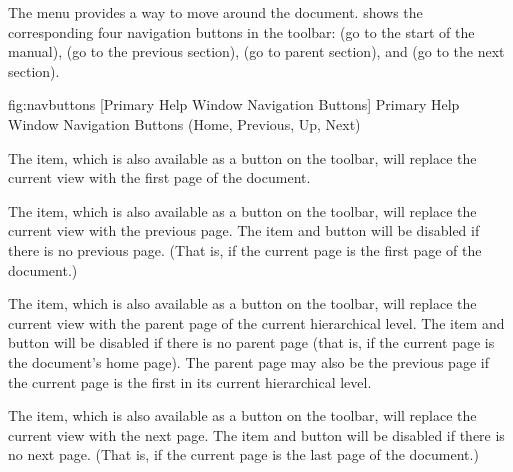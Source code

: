 
The  menu provides a way to move around
the document.
 shows the corresponding four navigation
buttons in the toolbar:  (go to the
start of the manual),  (go to the
previous section),  (go to parent
section), and  (go to the next
section).

\FloatFig
{fig:navbuttons}
{%
}
[Primary Help Window Navigation Buttons]
{Primary Help Window Navigation Buttons (Home, Previous, Up, Next)}


The  item, which is also available
as a button on the toolbar, will replace the current view with the
first page of the document.


The  item, which is also available as
a button on the toolbar, will replace the current view with the
previous page. The item and button will be disabled if there is no
previous page. (That is, if the current page is the first
page of the document.)


The  item, which is also available
as a button on the toolbar, will replace the current view with the
parent page of the current hierarchical level. The item and button
will be disabled if there is no parent page (that is, if the current
page is the document's home page). The parent page may
also be the previous page if the current page is the first in its
current hierarchical level.


The  item, which is also available as
a button on the toolbar, will replace the current view with the
next page. The item and button will be disabled if there is no
next page. (That is, if the current page is the last
page of the document.)

